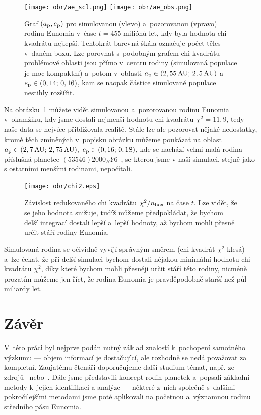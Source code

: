 \documentclass[A4paper, 12pt, oneside]{book}
\begin{document}
\immediate{}
\immediate{}
\begin{figure}
	\centering
	\texttt{[image: obr/ae\_scl.png]}
	\texttt{[image: obr/ae\_obs.png]}\\
	\caption{Graf $(a_{\rm p}, e_{\rm p})$ pro simulovanou (vlevo) a~pozorovanou (vpravo) rodinu Eunomia v~čase $t=455$ miliónů let, kdy byla hodnota chi kvadrátu nejlepší. Tentokrát barevná škála označuje počet těles v~daném boxu. Lze porovnat s~podobným grafem chi kvadrátu --- problémové oblasti jsou přímo v~centru rodiny (simulovaná populace je moc kompaktní) a~potom v~oblasti $a_{\rm p}\in(2,55\,{\rm AU};\,2,5\,{\rm AU})$ a~$e_{\rm p}\in(0,14;\,0,16)$, kam se naopak částice simulované populace nestihly rozšířit.} \label{fig:ae_obs_scl}
\end{figure}

Na obrázku~\ref{fig:ae_obs_scl} můžete vidět simulovanou a~pozorovanou rodinu Eunomia v~okamžiku, kdy jsme dostali nejmenší hodnotu chi kvadrátu $\chi^2=11,9$, tedy naše data se nejvíce přibližovala realitě. Stále lze ale pozorovat nějaké nedostatky, kromě těch zmíněných v~popisku obrázku můžeme poukázat na oblast $a_{\rm p}\in(2,7\,{\rm AU};\,2,75\,{\rm AU}),\ e_{\rm p}\in(0,16;\,0,18)$, kde se nachází velmi malá rodina příslušná planetce $(53546) 2000_BY6$~\cite{milani14}, se kterou jsme v naší simulaci, stejně jako s ostatními menšími rodinami, nepočítali.

\begin{figure}
	\centering
	\texttt{[image: obr/chi2.eps]}
	\caption{Závislost redukovaného chi kvadrátu $\chi^2/n_{\rm box}$ na čase $t$. Lze vidět, že se jeho hodnota snižuje, tudíž můžeme předpokládat, že bychom delší integrací dostali lepší a~lepší hodnoty, až bychom mohli přesně určit stáří rodiny Eunomia.} \label{fig:chi2}
\end{figure}

Simulovaná rodina se očividně vyvíjí správným směrem (chi kvadrát $\chi^2$ klesá) a~lze čekat, že při delší simulaci bychom dostali nějakou minimální hodnotu chi kvadrátu $\chi^2$, díky které bychom mohli přesněji určit stáří této rodiny, nicméně prozatím můžeme jen říct, že rodina Eunomia je pravděpodobně starší než půl miliardy let.

\chapter{Závěr} \label{ch:zaver}
V~této práci byl nejprve podán nutný základ znalostí k~pochopení samotného výzkumu --- objem informací je dostačující, ale rozhodně se nedá považovat za kompletní. Zaujatému čtenáři doporučujeme další studium témat, např. ze zdrojů~\cite{murray00} nebo~\cite{fmt}. Dále jsme představili koncept rodin planetek a~popsali základní metody k~jejich identifikaci a analýze --- některé z~nich společně s~dalšími pokročilejšími metodami jsme poté aplikovali na početnou a~významnou rodinu středního pásu Eunomia.
\end{document}
